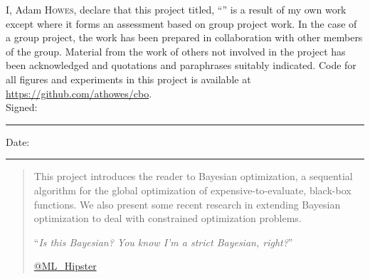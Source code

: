 \documentclass[
11pt, %
english, %
singlespacing, %
toctotoc, %
parskip, %
headsepline, %
consistentlayout, %
]{MastersDoctoralThesis} %
\begin{document}

\begin{declaration}
\addchaptertocentry{\authorshipname} %
\noindent I, Adam \textsc{Howes}, declare that this project titled, \enquote{\ttitle} is a result of my own work except where it forms an assessment based on group project work. In the case of a group project, the work has been prepared in collaboration with other members of the group. Material from the work of others not involved in the project has been acknowledged and quotations and paraphrases suitably indicated. Code for all figures and experiments in this project is available at \url{https://github.com/athowes/cbo}.\\
 
\noindent Signed:\\
\rule[0.5em]{25em}{0.5pt} %
 
\noindent Date:\\
\rule[0.5em]{25em}{0.5pt} %
\end{declaration}

\cleardoublepage


\begin{abstract}
\addchaptertocentry{\abstractname} %
This project introduces the reader to Bayesian optimization, a sequential algorithm for the global optimization of expensive-to-evaluate, black-box functions. We also present some recent research in extending Bayesian optimization to deal with constrained optimization problems.

\vspace*{0.2\textheight}

\vspace*{0.2\textheight}

\noindent\enquote{\itshape Is this Bayesian? You know I'm a strict Bayesian, right?}\bigbreak

\hfill \href{https://twitter.com/ML_Hipster}{@ML{\_}Hipster}

\end{abstract}
\end{document}
